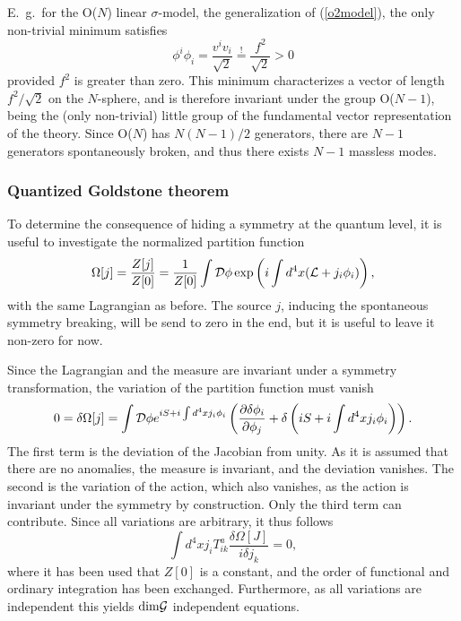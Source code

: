 \documentclass[final,12pt]{article}
\newcommand*{\La}{{\cal{L}}}
\newcommand*{\no}{\noindent}
\newcommand*{\be}{\begin{equation}}
\newcommand*{\ee}{\end{equation}}
\newcommand*{\pd}{\partial}
\newcommand*{\pref}[1]{(\ref{#1})}
\newcommand*{\nn}{\nonumber}
\newcommand*{\1}{1\!\!\!\bot}
\begin{document}
E.\ g.\ for the O($N$) linear $\sigma$-model, the generalization of \pref{o2model}, the only non-trivial minimum satisfies
\be
\phi^i\phi_i=\frac{v^iv_i}{\sqrt{2}}\stackrel{!}{=}\frac{f^2}{\sqrt{2}}>0\nn
\ee
\no provided $f^2$ is greater than zero. This minimum characterizes a vector of length $f^2/\sqrt{2}$ on the $N$-sphere, and is therefore invariant under the group O($N-1$), being the (only non-trivial) little group of the fundamental vector representation of the theory. Since O($N$) has $N(N-1)/2$ generators, there are $N-1$ generators spontaneously broken, and thus there exists $N-1$ massless modes.

\subsubsection{Quantized Goldstone theorem}\label{ss:qgoldstone}

To determine the consequence of hiding a symmetry at the quantum level, it is useful to investigate the normalized partition function
\be
\Omega[j]=\frac{Z[j]}{Z[0]}=\frac{1}{Z[0]}\int{\cal D}\phi\exp\left(i\int d^4x(\La+j_i\phi_i)\right)\nn,
\ee
\no with the same Lagrangian as before. The source $j$, inducing the spontaneous symmetry breaking, will be send to zero in the end, but it is useful to leave it non-zero for now.

Since the Lagrangian and the measure are invariant under a symmetry transformation, the variation of the partition function must vanish
\be
0=\delta\Omega[j]=\int {\cal D}\phi e^{iS+i\int d^4 xj_i\phi_i}\left(\frac{\pd\delta\phi_i}{\pd\phi_j}+\delta\left(iS+i \int d^4xj_i\phi_i\right)\right)\nn.
\ee
\no The first term is the deviation of the Jacobian from unity. As it is assumed that there are no anomalies, the measure is invariant, and the deviation vanishes. The second is the variation of the action, which also vanishes, as the action is invariant under the symmetry by construction. Only the third term can contribute. Since all variations are arbitrary, it thus follows
\be
\int d^4x j_i T_{ik}^a\frac{\delta \Omega[J]}{i\delta j_k}=0\nn,
\ee
\no where it has been used that $Z[0]$ is a constant, and the order of functional and ordinary integration has been exchanged. Furthermore, as all variations are independent this yields $\mathrm{dim}{\cal G}$ independent equations.
\end{document}
